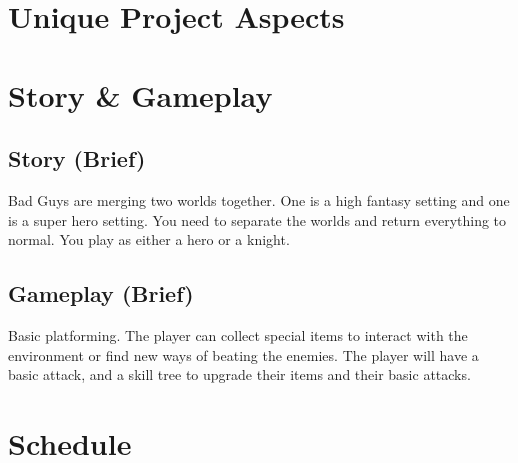 \documentclass[titlepage]{article}
\begin{document}
\section{Unique Project Aspects}

\section{Story \& Gameplay}
\subsection*{Story (Brief)}
Bad Guys are merging two worlds together. One is a high fantasy setting and one is a super hero setting. You need to separate the worlds and return everything to normal. You play as either a hero or a knight. 
\subsection*{Gameplay (Brief)}
Basic platforming. The player can collect special items to interact with the environment or find new ways of beating the enemies. The player will have a basic attack, and a skill tree to upgrade their items and their basic attacks. 
\section{Schedule}
\end{document}
